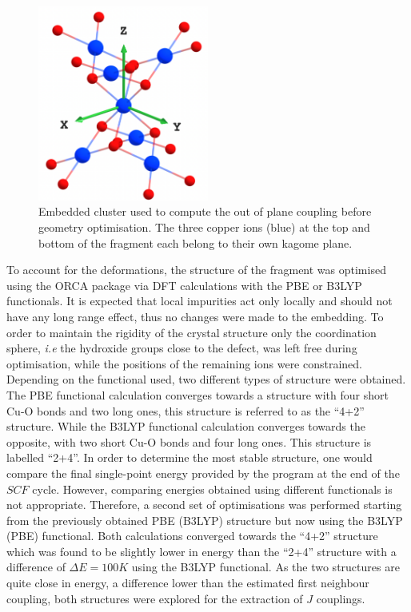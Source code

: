 \documentclass[10pt]{report}
\numberwithin{equation}{section}
\begin{document}
\begin{figure}[h!]
    \centering
    \includegraphics[width=0.5\textwidth]{Images/Fragment_AvOpt.png}
    \caption{Embedded cluster used to compute the out of plane coupling before geometry optimisation. The three copper ions (blue) at the top and bottom of the fragment each belong to their own kagome plane.}
    \label{fig:FragAv}
\end{figure}

To account for the deformations, the structure of the fragment was optimised using the ORCA package via DFT calculations with the PBE or B3LYP functionals.
It is expected that local impurities act only locally and should not have any long range effect, thus no changes were made to the embedding.
To order to maintain the rigidity of the crystal structure only the coordination sphere, \textit{i.e} the hydroxide groups close to the defect, was left free during optimisation, while the positions of the remaining ions were constrained.
Depending on the functional used, two different types of structure were obtained.
The PBE functional calculation converges towards a structure with four short Cu-O bonds and two long ones, this structure is referred to as the ``4+2'' structure.
While the B3LYP functional calculation converges towards the opposite, with two short Cu-O bonds and four long ones. This structure is labelled ``2+4''.
In order to determine the most stable structure, one would compare the final single-point energy provided by the program at the end of the $SCF$ cycle. However, comparing energies obtained using different functionals is not appropriate.
Therefore, a second set of optimisations was performed starting from the previously obtained PBE (B3LYP) structure but now using the B3LYP (PBE) functional.
Both calculations converged towards the ``4+2'' structure which was found to be slightly lower in energy than the ``2+4'' structure with a difference of $\Delta E=100 K$ using the B3LYP functional.
As the two structures are quite close in energy, a difference lower than the estimated first neighbour coupling, both structures were explored for the extraction of $J$ couplings.
\end{document}
